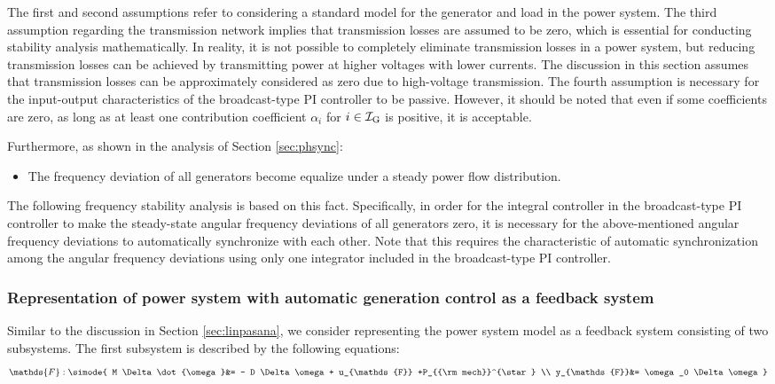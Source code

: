 \documentclass[graybox, envcountchap]{svmult}
\begin{document}
The first and second assumptions refer to considering a standard model for the
generator and load in the power system. The third assumption regarding the
transmission network implies that transmission losses are assumed to be zero,
which is essential for conducting stability analysis mathematically. In reality,
it is not possible to completely eliminate transmission losses in a power
system, but reducing transmission losses can be achieved by transmitting power
at higher voltages with lower currents. The discussion in this section assumes
that transmission losses can be approximately considered as zero due to
high-voltage transmission. The fourth assumption is necessary for the
input-output characteristics of the broadcast-type PI controller to be passive.
However, it should be noted that even if some coefficients are zero, as long as
at least one contribution coefficient $\alpha_i$ for $i\in \mathcal{I}_{\rm G}$
is positive, it is acceptable. 

Furthermore, as shown in the analysis of Section \ref{sec:phsync}:

\begin{itemize}
  \item The frequency deviation of all generators become equalize under a steady power flow distribution.
\end{itemize}

The following frequency stability analysis is based on this fact. Specifically,
in order for the integral controller in the broadcast-type PI controller to make
the steady-state angular frequency deviations of all generators zero, it is
necessary for the above-mentioned angular frequency deviations to automatically
synchronize with each other. Note that this requires the characteristic of
automatic synchronization among the angular frequency deviations using only one
integrator included in the broadcast-type PI controller.

\smallskip
\subsubsection{Representation of power system with automatic generation control
as a feedback system}

Similar to the discussion in Section \ref{sec:linpasana}, we consider
representing the power system model as a feedback system consisting of two
subsystems. The first subsystem is described by the following equations:
\begin{equation}\label{eq:sys1}
  \mathds{F}:
  \simode{
  M \Delta \dot{\omega}&= 
  - 
  D
  \Delta\omega 
  + 
  u_{\mathds{F}}
  +P_{{\rm mech}}^{\star}
  \\
  y_{\mathds{F}}&= \omega_0 \Delta\omega 
  }
\end{equation}
\end{document}
